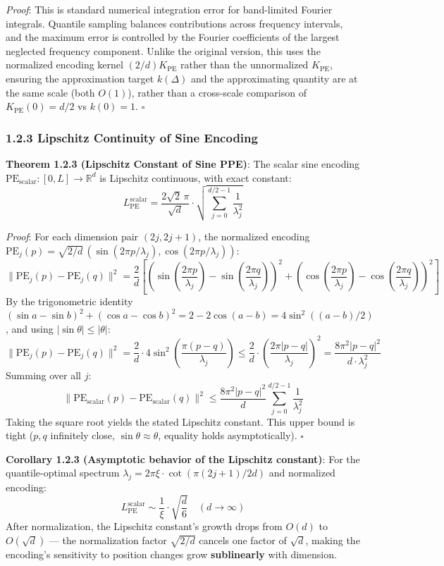 \documentclass[
  12pt,
]{article}
\begin{document}
\emph{Proof}: This is standard numerical integration error for band-limited Fourier integrals. Quantile sampling balances contributions across frequency intervals, and the maximum error is controlled by the Fourier coefficients of the largest neglected frequency component. Unlike the original version, this uses the normalized encoding kernel $(2/d)K_{\text{PE}}$ rather than the unnormalized $K_{\text{PE}}$, ensuring the approximation target $k(\Delta)$ and the approximating quantity are at the same scale (both $O(1)$), rather than a cross-scale comparison of $K_{\text{PE}}(0)=d/2$ vs $k(0)=1$. $\square$

\subsubsection{1.2.3 Lipschitz Continuity of Sine Encoding}\label{sine-lipschitz-continuity}

\textbf{Theorem 1.2.3 (Lipschitz Constant of Sine PPE)}: The scalar sine encoding $\text{PE}_{\text{scalar}}: [0, L] \to \mathbb{R}^d$ is Lipschitz continuous, with exact constant:
\[\boxed{L_{\text{PE}}^{\text{scalar}} = \frac{2\sqrt{2}\,\pi}{\sqrt{d}} \cdot \sqrt{\sum_{j=0}^{d/2-1} \frac{1}{\lambda_j^2}}}\]

\emph{Proof}: For each dimension pair $(2j, 2j+1)$, the normalized encoding $\text{PE}_j(p) = \sqrt{2/d}\,(\sin(2\pi p/\lambda_j), \cos(2\pi p/\lambda_j))$:
\[\|\text{PE}_j(p) - \text{PE}_j(q)\|^2 = \frac{2}{d}\left[\left(\sin\left(\frac{2\pi p}{\lambda_j}\right) - \sin\left(\frac{2\pi q}{\lambda_j}\right)\right)^2 + \left(\cos\left(\frac{2\pi p}{\lambda_j}\right) - \cos\left(\frac{2\pi q}{\lambda_j}\right)\right)^2\right]\]
By the trigonometric identity $(\sin a - \sin b)^2 + (\cos a - \cos b)^2 = 2 - 2\cos(a-b) = 4\sin^2((a-b)/2)$, and using $|\sin\theta| \leq |\theta|$:
\[\|\text{PE}_j(p) - \text{PE}_j(q)\|^2 = \frac{2}{d} \cdot 4\sin^2\!\left(\frac{\pi(p-q)}{\lambda_j}\right) \leq \frac{2}{d} \cdot \left(\frac{2\pi|p-q|}{\lambda_j}\right)^2 = \frac{8\pi^2|p-q|^2}{d \cdot \lambda_j^2}\]
Summing over all $j$:
\[\|\text{PE}_{\text{scalar}}(p) - \text{PE}_{\text{scalar}}(q)\|^2 \leq \frac{8\pi^2|p-q|^2}{d} \sum_{j=0}^{d/2-1} \frac{1}{\lambda_j^2}\]
Taking the square root yields the stated Lipschitz constant. This upper bound is tight ($p, q$ infinitely close, $\sin\theta \approx \theta$, equality holds asymptotically). $\square$

\textbf{Corollary 1.2.3 (Asymptotic behavior of the Lipschitz constant)}: For the quantile-optimal spectrum $\lambda_j = 2\pi\xi \cdot \cot(\pi(2j+1)/2d)$ and normalized encoding:
\[L_{\text{PE}}^{\text{scalar}} \sim \frac{1}{\xi} \cdot \sqrt{\frac{d}{6}} \quad (d \to \infty)\]
After normalization, the Lipschitz constant's growth drops from $O(d)$ to $O(\sqrt{d})$ --- the normalization factor $\sqrt{2/d}$ cancels one factor of $\sqrt{d}$, making the encoding's sensitivity to position changes grow \textbf{sublinearly} with dimension.
\end{document}
